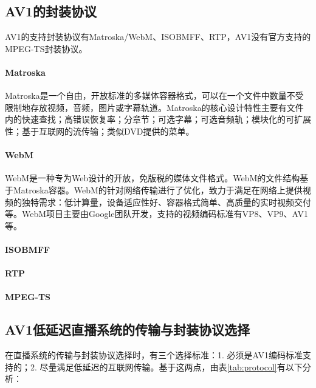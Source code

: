 \subsection{AV1的封装协议}

AV1的支持封装协议有Matroska/WebM、ISOBMFF、RTP，AV1没有官方支持的MPEG-TS封装协议。

\paragraph{Matroska} Matroska是一个自由，开放标准的多媒体容器格式，可以在一个文件中数量不受限制地存放视频，音频，图片或字幕轨道。Matroska的核心设计特性主要有文件内的快速查找；高错误恢复率；分章节；可选字幕；可选音频轨；模块化的可扩展性；基于互联网的流传输；类似DVD提供的菜单。

\paragraph{WebM} WebM是一种专为Web设计的开放，免版税的媒体文件格式。WebM的文件结构基于Matroska容器。WebM的针对网络传输进行了优化，致力于满足在网络上提供视频的独特需求：低计算量，设备适应性好、容器格式简单、高质量的实时视频交付等。WebM项目主要由Google团队开发，支持的视频编码标准有VP8、VP9、AV1等。

\paragraph{ISOBMFF}

\paragraph{RTP}

\paragraph{MPEG-TS}



\subsection{AV1低延迟直播系统的传输与封装协议选择}

在直播系统的传输与封装协议选择时，有三个选择标准：1. 必须是AV1编码标准支持的；2. 尽量满足低延迟的互联网传输。基于这两点，由表\ref{tab:protocol}有以下分析：

